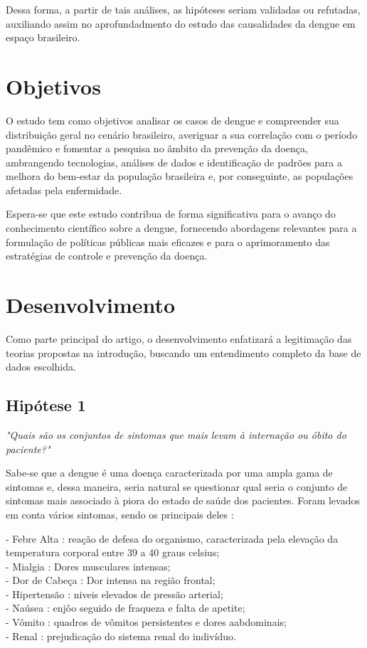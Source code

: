 \documentclass[a4paper,12pt]{article}
\begin{document}
Dessa forma, a partir de tais análises, as hipóteses seriam validadas ou refutadas, auxiliando assim no aprofundadmento do estudo das causalidades da dengue em espaço brasileiro.


\section{Objetivos}

O estudo tem como objetivos analisar os casos de dengue e compreender sua distribuição geral no cenário brasileiro, averiguar a sua correlação com o período pandêmico e fomentar a pesquisa no âmbito da prevenção da doença, ambrangendo tecnologias, análises de dados e identificação de padrões para a melhora do bem-estar da população brasileira e, por conseguinte, as populações afetadas pela enfermidade.

Espera-se que este estudo contribua de forma significativa para o avanço do conhecimento científico sobre a dengue, fornecendo abordagens relevantes para a formulação de políticas públicas mais eficazes e para o aprimoramento das estratégias de controle e prevenção da doença.

\section{Desenvolvimento}

Como parte principal do artigo, o desenvolvimento enfatizará a legitimação das teorias propostas na introdução, buscando um entendimento completo da base de dados escolhida.

\subsection{Hipótese 1}
\emph{"Quais são os conjuntos de sintomas que mais levam à internação ou óbito do paciente?"}

Sabe-se que a dengue é uma doença caracterizada por uma ampla gama de sintomas e, dessa maneira, seria natural se questionar qual seria o conjunto de sintomas mais associado à piora do estado de saúde dos pacientes.
Foram levados em conta vários sintomas, sendo os principais deles :
\begin{itemize}
    - Febre Alta : reação de defesa do organismo, caracterizada pela elevação da temperatura corporal entre 39 a 40 graus celsius;\\
    - Mialgia : Dores musculares intensas; \\
    - Dor de Cabeça : Dor intensa na região frontal;\\
    - Hipertensão : niveis elevados de pressão arterial;\\ 
    - Naúsea : enjôo seguido de fraqueza e falta de apetite;\\
    - Vômito : quadros de vômitos persistentes e dores aabdominais;\\
    - Renal : prejudicação do sistema renal do indivíduo.\\
\end{itemize}
\end{document}
